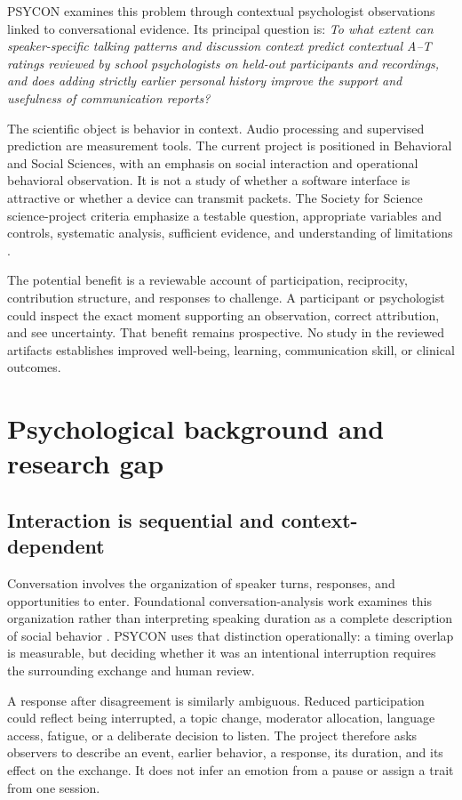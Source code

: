 \documentclass{article}
\begin{document}
PSYCON examines this problem through contextual psychologist observations linked to conversational evidence. Its principal question is: \emph{To what extent can speaker-specific talking patterns and discussion context predict contextual A--T ratings reviewed by school psychologists on held-out participants and recordings, and does adding strictly earlier personal history improve the support and usefulness of communication reports?}

The scientific object is behavior in context. Audio processing and supervised prediction are measurement tools. The current project is positioned in Behavioral and Social Sciences, with an emphasis on social interaction and operational behavioral observation. It is not a study of whether a software interface is attractive or whether a device can transmit packets. The Society for Science science-project criteria emphasize a testable question, appropriate variables and controls, systematic analysis, sufficient evidence, and understanding of limitations \cite{isefcriteria}.

The potential benefit is a reviewable account of participation, reciprocity, contribution structure, and responses to challenge. A participant or psychologist could inspect the exact moment supporting an observation, correct attribution, and see uncertainty. That benefit remains prospective. No study in the reviewed artifacts establishes improved well-being, learning, communication skill, or clinical outcomes.

\section{Psychological background and research gap}
\subsection{Interaction is sequential and context-dependent}
Conversation involves the organization of speaker turns, responses, and opportunities to enter. Foundational conversation-analysis work examines this organization rather than interpreting speaking duration as a complete description of social behavior \cite{sacks1974}. PSYCON uses that distinction operationally: a timing overlap is measurable, but deciding whether it was an intentional interruption requires the surrounding exchange and human review.

A response after disagreement is similarly ambiguous. Reduced participation could reflect being interrupted, a topic change, moderator allocation, language access, fatigue, or a deliberate decision to listen. The project therefore asks observers to describe an event, earlier behavior, a response, its duration, and its effect on the exchange. It does not infer an emotion from a pause or assign a trait from one session.
\end{document}
